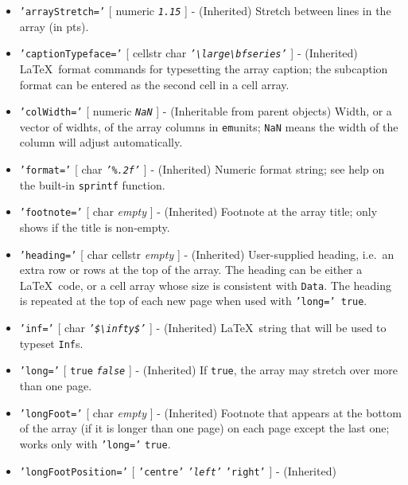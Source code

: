  \begin{itemize}
 \item
   \texttt{'arrayStretch='} {[} numeric \textbar{} \emph{\texttt{1.15}}
   {]} - (Inherited) Stretch between lines in the array (in pts).
 \item
   \texttt{'captionTypeface='} {[} cellstr \textbar{} char \textbar{}
   \emph{\texttt{'\textbackslash{}large\textbackslash{}bfseries'}} {]} -
   (Inherited) \LaTeX~format commands for typesetting the array caption;
   the subcaption format can be entered as the second cell in a cell
   array.
 \item
   \texttt{'colWidth='} {[} numeric \textbar{} \emph{\texttt{NaN}} {]} -
   (Inheritable from parent objects) Width, or a vector of widhts, of the
   array columns in \texttt{em}units; \texttt{NaN} means the width of the
   column will adjust automatically.
 \item
   \texttt{'format='} {[} char \textbar{} \emph{\texttt{'\%.2f'}} {]} -
   (Inherited) Numeric format string; see help on the built-in
   \texttt{sprintf} function.
 \item
   \texttt{'footnote='} {[} char \textbar{} \emph{empty} {]} -
   (Inherited) Footnote at the array title; only shows if the title is
   non-empty.
 \item
   \texttt{'heading='} {[} char \textbar{} cellstr \textbar{}
   \emph{empty} {]} - (Inherited) User-supplied heading, i.e.~an extra
   row or rows at the top of the array. The heading can be either a
   \LaTeX~code, or a cell array whose size is consistent with
   \texttt{Data}. The heading is repeated at the top of each new page
   when used with \texttt{'long=' true}.
 \item
   \texttt{'inf='} {[} char \textbar{}
   \emph{\texttt{'\$\textbackslash{}infty\$'}} {]} - (Inherited)
   \LaTeX~string that will be used to typeset \texttt{Inf}s.
 \item
   \texttt{'long='} {[} \texttt{true} \textbar{} \emph{\texttt{false}}
   {]} - (Inherited) If \texttt{true}, the array may stretch over more
   than one page.
 \item
   \texttt{'longFoot='} {[} char \textbar{} \emph{empty} {]} -
   (Inherited) Footnote that appears at the bottom of the array (if it is
   longer than one page) on each page except the last one; works only
   with \texttt{'long='} \texttt{true}.
 \item
   \texttt{'longFootPosition='} {[} \texttt{'centre'} \textbar{}
   \emph{\texttt{'left'}} \textbar{} \texttt{'right'} {]} - (Inherited)

\end{itemize}
